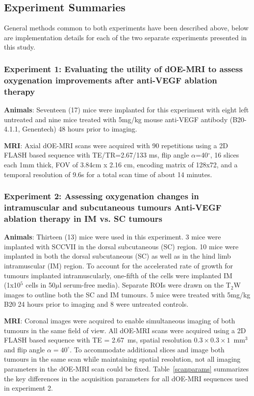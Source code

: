 \subsection{Experiment Summaries}
General methods common to both experiments have been described above, below are implementation details for each of the two separate experiments presented in this study.

\subsubsection{Experiment 1: Evaluating the utility of dOE-MRI to assess oxygenation improvements after anti-VEGF ablation therapy}
\label{sec:B20_expt1}
\noindent\textbf{Animals}: Seventeen (17) mice were implanted for this experiment with eight left untreated and nine mice treated with 5mg/kg mouse anti-VEGF antibody (B20-4.1.1, Genentech) 48 hours prior to imaging.

\noindent\textbf{MRI}: Axial \ac{dOE-MRI} scans were acquired with 90 repetitions using a 2D FLASH based sequence with TE/TR=2.67/133 ms, flip angle $\alpha$=40$^\circ$, 16 slices each 1mm thick, FOV of 3.84cm x 2.16 cm, encoding matrix of 128x72, and a temporal resolution of 9.6s for a total scan time of about 14 minutes.

\subsubsection{Experiment 2: Assessing oxygenation changes in intramuscular and subcutaneous tumours Anti-VEGF ablation therapy in \acs{IM} vs. \acs{SC} tumours}
\noindent\textbf{Animals}: Thirteen (13) mice were used in this experiment. 
3 mice were implanted with SCCVII in the dorsal subcutaneous (SC) region.
10 mice were implanted in both the dorsal subcutaneous (SC) as well as in the hind limb intramuscular (IM) region.
To account for the accelerated rate of growth for tumours implanted intramuscularly, one-fifth of the cells were implanted \acs{IM} (1x10$^5$ cells in 50$\mu$l serum-free media).
Separate ROIs were drawn on the T$_2$W images to outline both the \acs{SC} and \acs{IM} tumours.
5 mice were treated with 5mg/kg B20 24 hours prior to imaging and 8 were untreated controls.

\noindent\textbf{MRI}: Coronal images were acquired to enable simultaneous imaging of both tumours in the same field of view.
All \ac{dOE-MRI} scans were acquired using a 2D FLASH based sequence with TE = 2.67~ms, spatial resolution $0.3\times 0.3\times 1$~mm$^3$ and flip angle $\alpha=40^\circ$.
To accommodate additional slices and image both tumours in the same scan while maintaining spatial resolution, not all imaging parameters in the \ac{dOE-MRI} scan could be fixed. 
Table~\ref{scanparams} summarizes the key differences in the acquisition parameters for all \ac{dOE-MRI} sequences used in experiment 2.

